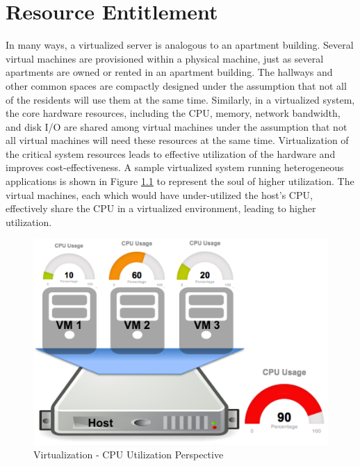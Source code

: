 \chapter{Resource Entitlement}


In many ways, a virtualized server is analogous to an apartment building. Several virtual machines are provisioned within a physical machine, just as several apartments are owned or rented in an apartment building. The hallways and other common spaces are compactly designed under the assumption that not all of the residents will use them at the same time. Similarly, in a virtualized system, the core hardware resources, including the CPU, memory, network bandwidth, and disk I/O are shared among virtual machines under the assumption that not all virtual machines will need these resources at the same time. Virtualization of the critical system resources leads to effective utilization of the hardware and improves cost-effectiveness. A sample virtualized system running heterogeneous applications is shown in Figure \ref{fig:resourceutil} to represent the soul of higher utilization. The virtual machines, each which would have under-utilized the host's CPU, effectively share the CPU in a virtualized environment, leading to higher utilization.  

\begin{figure}[htbp]
\centering
\includegraphics[width=130mm]{resourceutil.png}
\caption{Virtualization - CPU Utilization Perspective}
\label{fig:resourceutil}
\end{figure}

